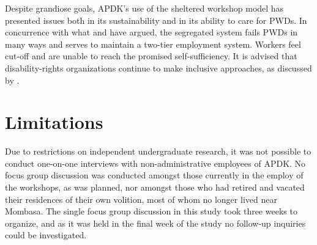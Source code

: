 \documentclass{../../../coursework}
\begin{document}
Despite grandiose goals, APDK's use of the sheltered workshop model has
presented issues both in its sustainability and in its ability to care for
PWDs. In concurrence with what \textcite{Cobley2012} and \textcite{2011} have
argued, the segregated system fails PWDs in many ways and serves to maintain a
two-tier employment system. Workers feel cut-off and are unable to reach the
promised self-sufficiency. It is advised that disability-rights organizations
continue to make inclusive approaches, as discussed by \textcite{Cobley2012}.

\section{Limitations}

Due to restrictions on independent undergraduate research, it was not possible
to conduct one-on-one interviews with non-administrative employees of APDK. No
focus group discussion was conducted amongst those currently in the employ of
the workshops, as was planned, nor amongst those who had retired and vacated
their residences of their own volition, most of whom no longer lived near
Mombasa. The single focus group discussion in this study took three weeks to
organize, and as it was held in the final week of the study no follow-up
inquiries could be investigated.

\printbibliography
\end{document}
